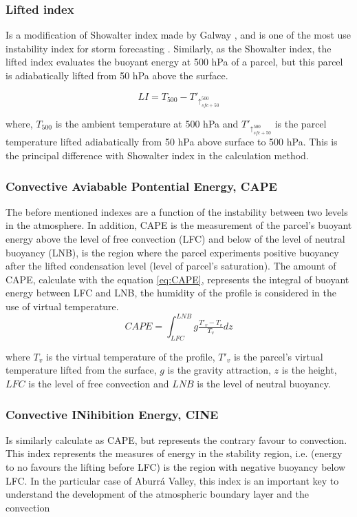\documentclass{ametsoc}
\begin{document}
\subsubsection{Lifted index}

Is a modification of Showalter index made by Galway \cite{galway1956lifted}, and is one of the most use instability index for storm forecasting \cite{peppler1988review}. Similarly, as the Showalter index, the lifted index evaluates the buoyant energy at 500 hPa of a parcel, but this parcel is adiabatically lifted from 50 hPa above the surface. 

\begin{equation}
LI = T_{500} - T'_{\uparrow_{sfc +50}^{500} }
\label{eq:LI}
\end{equation}

where, $T_{500}$ is the ambient temperature at 500 hPa and $T'_{\uparrow_{sfc +50}^{500} }$ is the parcel temperature lifted adiabatically  from 50 hPa above surface to 500 hPa. This is the principal difference with Showalter index in the calculation method.\\


\subsubsection{Convective Aviabable Pontential Energy, CAPE}
The before mentioned indexes are a function of the instability between two levels in the atmosphere. In addition, CAPE is the measurement of the parcel's buoyant energy above the level of free convection (LFC) and below of the level of neutral buoyancy (LNB), is the region where the parcel experiments positive buoyancy after the lifted condensation level (level of parcel's saturation). The amount of CAPE, calculate with the equation \ref{eq:CAPE}, represents the integral of buoyant energy between LFC and LNB, the humidity of the profile is considered in the use of virtual temperature. 
\begin{equation}
CAPE = \int_{LFC}^{LNB}g\tfrac{T'_v-T_v}{T_v}dz
\label{eq:CAPE}
\end{equation}

where  $T_v$ is the virtual temperature of the profile, $T'_v$ is the parcel's virtual temperature lifted from the surface, $g$ is the gravity attraction, $z$ is the height, $LFC$ is the level of free convection and $LNB$ is the level of neutral buoyancy.

\subsubsection{Convective INihibition Energy, CINE}
Is similarly calculate as CAPE, but represents the contrary favour to convection. This index represents the measures of energy in the stability region, i.e. (energy to no favours the lifting before LFC) is the region with negative buoyancy below LFC. In the particular case of Aburrá Valley, this index is an important key to understand the development of the atmospheric boundary layer and the convection 
\end{document}
